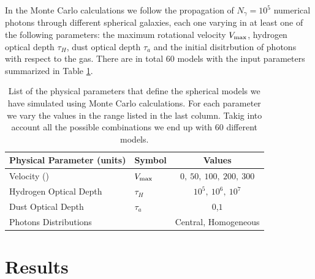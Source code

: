 \documentclass[usenatbib]{mn2e}
\newcommand{\kms}{{\ifmmode{{\mathrm{\,km\ s}^{-1}}}\else{\,km~s$^{-1}$}\fi}}
\begin{document}
In the Monte Carlo calculations we follow the propagation of $N_{\gamma}=10^5$
numerical photons through different spherical galaxies, each one
varying in at least one of the following parameters: the maximum
rotational velocity $V_{\rm max}$, hydrogen optical depth $\tau_{H}$,
dust optical depth $\tau_{a}$ and the initial disitrbution of photons
with respect to the gas. There are in total 60 models with the input
parameters summarized in Table \ref{table:models}.  

\begin{table}
\begin{center}
\begin{tabular}{llc}\hline\hline
Physical Parameter (units) & Symbol & Values\\\hline
Velocity (\kms) & $V_{\rm max}$&$0,\ 50,\ 100,\ 200,\ 300$\\
Hydrogen Optical Depth & $\tau_{H} $ & $10^{5},\ 10^{6},\ 10^{7}$\\
Dust Optical Depth & $\tau_{a}$ & $0$,$1$\\
Photons Distributions & & Central, Homogeneous\\\hline\hline
\end{tabular}
\caption{
List of the physical parameters that define the spherical models we
have simulated using Monte Carlo calculations. For each parameter we
vary the values in the range listed in the last column. Takig into
account all the possible combinations we end up with $60$ different
models. } 
\label{table:models}
\end{center}
\end{table}


\section{Results}
\label{sec:results}
\end{document}
